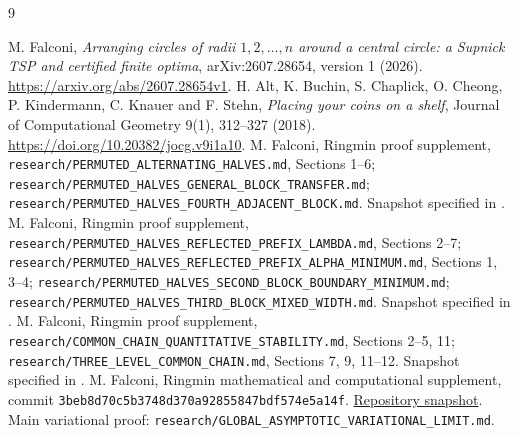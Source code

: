 \documentclass[11pt]{article}
\theoremstyle{definition}\newtheorem{definition}[theorem]{Definition}
\theoremstyle{remark}\newtheorem{remark}[theorem]{Remark}
\begin{document}
\begin{thebibliography}{9}
\small\raggedright
{} M. Falconi, \emph{Arranging circles of radii $1,2,\ldots,n$
around a central circle: a Supnick TSP and certified finite optima},
arXiv:2607.28654, version 1 (2026).
\url{https://arxiv.org/abs/2607.28654v1}.
 H. Alt, K. Buchin, S. Chaplick, O. Cheong, P. Kindermann,
C. Knauer and F. Stehn, \emph{Placing your coins on a shelf}, Journal of
Computational Geometry 9(1), 312--327 (2018).
\url{https://doi.org/10.20382/jocg.v9i1a10}.
 M. Falconi, Ringmin proof supplement,
\nolinkurl{research/PERMUTED_ALTERNATING_HALVES.md}, Sections 1--6;
\nolinkurl{research/PERMUTED_HALVES_GENERAL_BLOCK_TRANSFER.md};
\nolinkurl{research/PERMUTED_HALVES_FOURTH_ADJACENT_BLOCK.md}.
Snapshot specified in \cite{supplement}.
 M. Falconi, Ringmin proof supplement,
\nolinkurl{research/PERMUTED_HALVES_REFLECTED_PREFIX_LAMBDA.md}, Sections 2--7;
\nolinkurl{research/PERMUTED_HALVES_REFLECTED_PREFIX_ALPHA_MINIMUM.md}, Sections 1, 3--4;
\nolinkurl{research/PERMUTED_HALVES_SECOND_BLOCK_BOUNDARY_MINIMUM.md};
\nolinkurl{research/PERMUTED_HALVES_THIRD_BLOCK_MIXED_WIDTH.md}.
Snapshot specified in \cite{supplement}.
 M. Falconi, Ringmin proof supplement,
\nolinkurl{research/COMMON_CHAIN_QUANTITATIVE_STABILITY.md}, Sections 2--5, 11;
\nolinkurl{research/THREE_LEVEL_COMMON_CHAIN.md}, Sections 7, 9, 11--12.
Snapshot specified in \cite{supplement}.
 M. Falconi, Ringmin mathematical and computational
supplement, commit \texttt{3beb8d70c5b3748d370a92855847bdf574e5a14f}.
\href{https://github.com/falker47/ringmin/tree/3beb8d70c5b3748d370a92855847bdf574e5a14f}{Repository snapshot}.
Main variational proof:
\nolinkurl{research/GLOBAL_ASYMPTOTIC_VARIATIONAL_LIMIT.md}.
\end{thebibliography}
\end{document}
